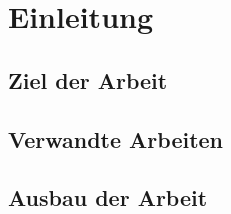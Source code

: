  \section{Einleitung}
\subsection{Ziel der Arbeit}
\subsection{Verwandte Arbeiten}
\subsection{Ausbau der Arbeit}
\clearpage

